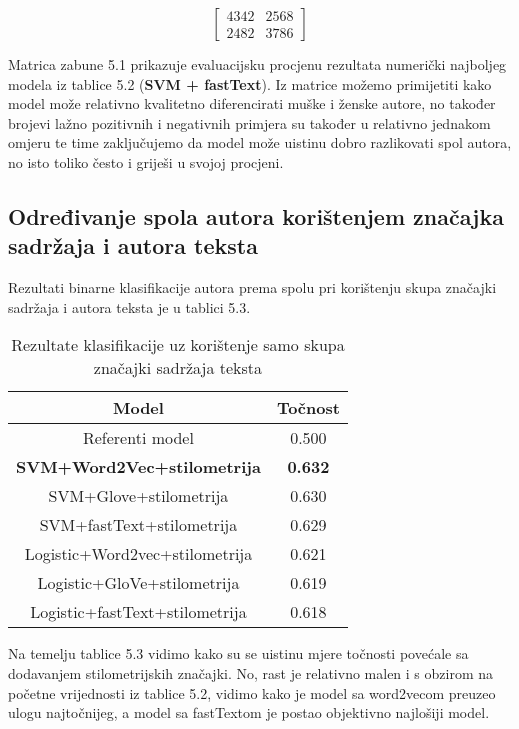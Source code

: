 \documentclass[times, utf8, zavrsni]{fer}
\begin{document}
\begin{equation}
	\begin{bmatrix}
	4342 & 2568 \\
	2482 & 3786
	\end{bmatrix}
\end{equation}\newline

Matrica zabune 5.1 prikazuje evaluacijsku procjenu rezultata numerički najboljeg modela iz tablice 5.2 (\textbf{SVM + fastText}). Iz matrice možemo primijetiti kako model može relativno kvalitetno diferencirati muške i ženske autore, no također brojevi lažno pozitivnih i negativnih primjera su također u relativno jednakom omjeru te time zaključujemo da model može uistinu dobro razlikovati spol autora, no isto toliko često i griješi u svojoj procjeni.


\newpage

\subsection*{Određivanje spola autora korištenjem značajka sadržaja i autora teksta}

Rezultati binarne klasifikacije autora prema spolu pri korištenju skupa značajki sadržaja i autora teksta je u tablici 5.3.


\begin{table}[h!]
	\centering
	\begin{tabular}{||c|c||} 
		\hline
		Model & Točnost\\ [0.5ex] 
		\hline
		Referenti model & 0.500\\
		\hline
		\textbf{SVM+Word2Vec+stilometrija} & \textbf{0.632} \\
		\hline
		SVM+Glove+stilometrija & 0.630 \\
		\hline
		SVM+fastText+stilometrija & 0.629 \\
		\hline 
		Logistic+Word2vec+stilometrija & 0.621 \\ 
		\hline
		Logistic+GloVe+stilometrija & 0.619 \\ 
		\hline
		Logistic+fastText+stilometrija & 0.618 \\ 
		\hline
	\end{tabular}
	\caption{ Rezultate klasifikacije uz korištenje samo skupa značajki sadržaja teksta}
	\label{Table:1}
\end{table}

Na temelju tablice 5.3 vidimo kako su se uistinu mjere točnosti povećale sa dodavanjem stilometrijskih značajki. No, rast je relativno malen i s obzirom na početne vrijednosti iz tablice 5.2, vidimo kako je model sa word2vecom preuzeo ulogu najtočnijeg, a model sa fastTextom je postao objektivno najlošiji model.\newline
\end{document}
